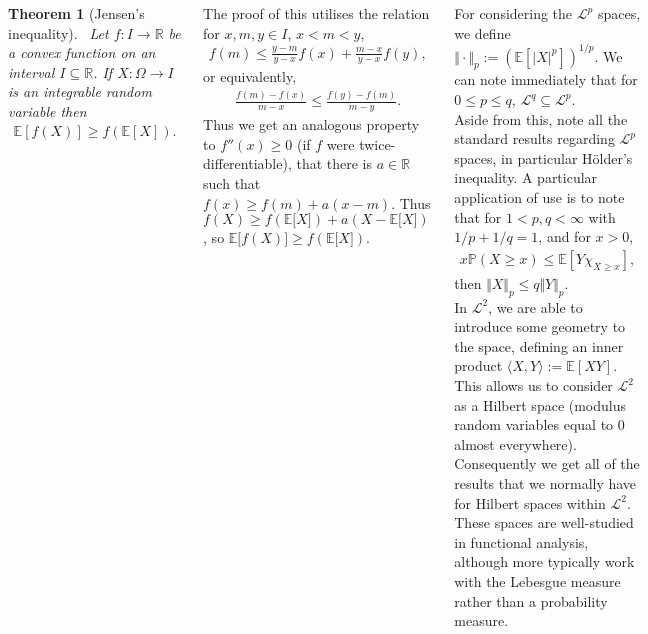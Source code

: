 \documentclass{tikzposter} %
\newtheorem{theorem}{Theorem}
\begin{document}
\begin{columns}
{{    \begin{theorem}[Jensen's inequality]
      \ Let $f : I \to \mathbb{R}$ be a convex function on an interval $I \subseteq \mathbb{R}$. If $X : \Omega \to I$ is an integrable random variable then
      \begin{align*}
        \mathbb{E}[f(X)] \ge f(\mathbb{E}[X]).
      \end{align*}
    \end{theorem}
    \hphantom{}

    The proof of this utilises the relation for $x,m,y \in I$, $x < m < y$,
    \begin{align*}
      f(m) \le \frac{y-m}{y-x}f(x)+\frac{m-x}{y-x}f(y),
    \end{align*}
    or equivalently,
    \begin{align*}
      \frac{f(m)-f(x)}{m-x} \le \frac{f(y)-f(m)}{m-y}.
    \end{align*}
    Thus we get an analogous property to $f''(x) \ge 0$ (if $f$ were twice-differentiable), that there is $a \in \mathbb{R}$ such that $f(x) \ge f(m) + a(x-m)$. Thus $f(X) \ge f(\mathbb{E}\big[X\big]) + a(X-\mathbb{E}\big[X\big])$, so $\mathbb{E}\big[f(X)\big] \ge f(\mathbb{E}\big[X\big])$.
    }

    For considering the $\mathcal{L}^{p}$ spaces, we define $\Vert \cdot \Vert_{p} := \left(\mathbb{E}[|X|^{p}]\right)^{1/p}$. We can note immediately that for $0 \le p \le q$, $\mathcal{L}^{q} \subseteq \mathcal{L}^{p}$. \\

    Aside from this, note all the standard results regarding $\mathcal{L}^{p}$ spaces, in particular H\"{o}lder's inequality. A particular application of use is to note that for $1 < p, q < \infty$ with $1/p+1/q = 1$, and for $x > 0$,
    \begin{align*}
      x \mathbb{P}(X \ge x) \le \mathbb{E}[Y \chi_{X \ge x}],
    \end{align*}
    then $\Vert X \Vert_{p} \le q \Vert Y \Vert_{p}$. \\

    In $\mathcal{L}^{2}$, we are able to introduce some geometry to the space, defining an inner product $\langle X, Y \rangle := \mathbb{E}[XY]$. This allows us to consider $\mathcal{L}^{2}$ as a Hilbert space (modulus random variables equal to $0$ almost everywhere). Consequently we get all of the results that we normally have for Hilbert spaces within $\mathcal{L}^{2}$. These spaces are well-studied in functional analysis, although more typically work with the Lebesgue measure rather than a probability measure.
  }




\end{columns}
\end{document}
